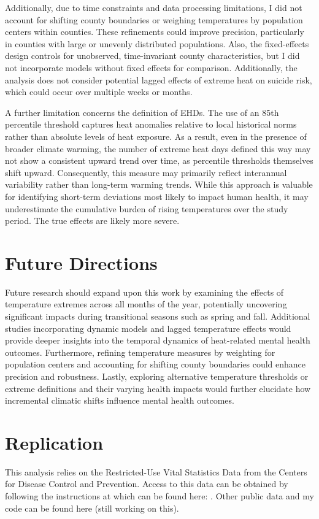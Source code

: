 \documentclass[12pt, a4paper]{article}
\begin{document}
Additionally, due to time constraints and data processing limitations, I did not account for shifting county boundaries or weighing temperatures by population centers within counties. These refinements could improve precision, particularly in counties with large or unevenly distributed populations. Also, the fixed-effects design controls for unobserved, time-invariant county characteristics, but I did not incorporate models without fixed effects for comparison. Additionally, the analysis does not consider potential lagged effects of extreme heat on suicide risk, which could occur over multiple weeks or months.

A further limitation concerns the definition of EHDs. The use of an 85th percentile threshold captures heat anomalies relative to local historical norms rather than absolute levels of heat exposure. As a result,  even in the presence of broader climate warming, the number of extreme heat days defined this way may not show a consistent upward trend over time, as percentile thresholds themselves shift upward. Consequently, this measure may primarily reflect interannual variability rather than long-term warming trends. While this approach is valuable for identifying short-term deviations most likely to impact human health, it may underestimate the cumulative burden of rising temperatures over the study period. The true effects are likely more severe.

\section{Future Directions}
Future research should expand upon this work by examining the effects of temperature extremes across all months of the year, potentially uncovering significant impacts during transitional seasons such as spring and fall. Additional studies incorporating dynamic models and lagged temperature effects would provide deeper insights into the temporal dynamics of heat-related mental health outcomes. Furthermore, refining temperature measures by weighting for population centers and accounting for shifting county boundaries could enhance precision and robustness. Lastly, exploring alternative temperature thresholds or extreme definitions and their varying health impacts would further elucidate how incremental climatic shifts influence mental health outcomes.

\section{Replication}
This analysis relies on the Restricted-Use Vital Statistics Data from the Centers for Disease Control and Prevention. Access to this data can be obtained by following the instructions at which can be found here: \cite{nchsRestrictedData2021}. Other public data and my code can be found here (still working on this).
\newpage
\end{document}
